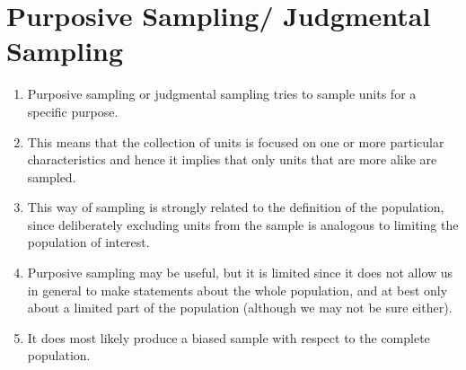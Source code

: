 \section{Purposive Sampling/ Judgmental Sampling \cite{statistics/book/Statistics-for-Data-Scientists/Maurits-Kaptein}}\label{Sampling Plans/Non-representative Sampling/Purposive Sampling or Judgmental Sampling}

\begin{enumerate}
    \item Purposive sampling or judgmental sampling tries to sample units for a specific purpose.
    \hfill \cite{statistics/book/Statistics-for-Data-Scientists/Maurits-Kaptein}

    \item This means that the collection of units is focused on one or more particular characteristics and hence it implies that only units that are more alike are sampled.
    \hfill \cite{statistics/book/Statistics-for-Data-Scientists/Maurits-Kaptein}

    \item This way of sampling is strongly related to the definition of the population, since deliberately excluding units from the sample is analogous to limiting the population of interest.
    \hfill \cite{statistics/book/Statistics-for-Data-Scientists/Maurits-Kaptein}

    \item Purposive sampling may be useful, but it is limited since it does not allow us in general to make statements about the whole population, and at best only about a limited part of the population (although we may not be sure either).
    \hfill \cite{statistics/book/Statistics-for-Data-Scientists/Maurits-Kaptein}

    \item It does most likely produce a biased sample with respect to the complete population.
    \hfill \cite{statistics/book/Statistics-for-Data-Scientists/Maurits-Kaptein}
\end{enumerate}
